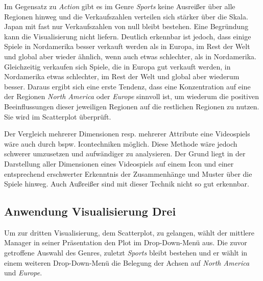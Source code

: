 \documentclass[usegeometry=true]{scrartcl}
\begin{document}
Im Gegensatz zu \textit{Action} gibt es im Genre \textit{Sports} keine Ausreißer über alle Regionen hinweg und die Verkaufszahlen verteilen sich stärker über die Skala. 
Japan mit fast nur Verkaufszahlen von null bleibt bestehen. Eine Begründung kann die Visualisierung nicht liefern.
Deutlich erkennbar ist jedoch, dass einige Spiele in Nordamerika besser verkauft werden als in Europa, im Rest der Welt und global aber wieder ähnlich, wenn auch etwas schlechter, als in Nordamerika. 
Gleichzeitig verkaufen sich Spiele, die in Europa gut verkauft werden, in Nordamerika etwas schlechter, im Rest der Welt und global aber wiederum besser. 
Daraus ergibt sich eine erste Tendenz, dass eine Konzentration auf eine der Regionen \textit{North America} oder \textit{Europe} sinnvoll ist, um wiederum die positiven Beeinflussungen dieser jeweiligen Regionen auf die restlichen Regionen zu nutzen. 
Sie wird im Scatterplot überprüft.

Der Vergleich mehrerer Dimensionen resp. mehrerer Attribute eine Videospiels wäre auch durch bspw. Icontechniken möglich. 
Diese Methode wäre jedoch schwerer umzusetzen und aufwändiger zu analysieren. 
Der Grund liegt in der Darstellung aller Dimensionen eines Videospiels auf einem Icon und einer entsprechend erschwerter Erkenntnis der Zusammenhänge und Muster über die Spiele hinweg. 
Auch Außreißer sind mit dieser Technik nicht so gut erkennbar.

\subsection{Anwendung Visualisierung Drei}
Um zur dritten Visualisierung, dem Scatterplot, zu gelangen, wählt der mittlere Manager in seiner Präsentation den Plot im Drop-Down-Menü aus.
Die zuvor getroffene Auswahl des Genres, zuletzt \textit{Sports} bleibt bestehen und er wählt in einem weiteren Drop-Down-Menü die Belegung der Achsen auf \textit{North America} und \textit{Europe}.
\end{document}
